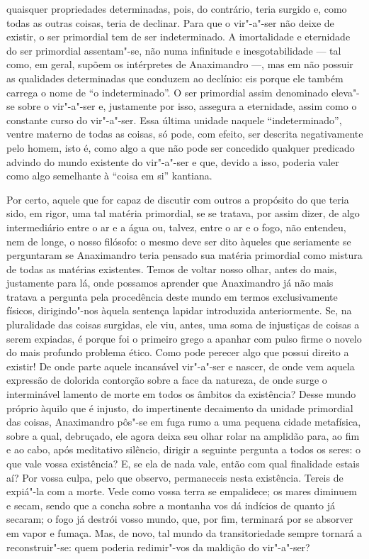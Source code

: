 quaisquer propriedades determinadas, pois, do contrário, teria surgido e,
como todas as outras coisas, teria de declinar. Para que o vir"-a"-ser não
deixe de existir, o ser primordial tem de ser indeterminado. A imortalidade e
eternidade do ser primordial assentam"-se, não numa infinitude e
inesgotabilidade --- tal como, em geral, supõem os intérpretes de
Anaximandro ---, mas em não possuir as qualidades determinadas que conduzem ao
declínio: eis porque ele também carrega o nome de ``o indeterminado''. O ser
primordial assim denominado eleva"-se sobre o vir"-a"-ser e, justamente por
isso, assegura a eternidade, assim como o constante curso do vir"-a"-ser.
Essa última \label{essaultimaunidade} unidade naquele ``indeterminado'',
ventre materno de todas as coisas, só pode, com efeito, ser descrita
negativamente pelo homem, isto é, como algo a que não pode ser concedido
qualquer predicado advindo do mundo existente do vir"-a"-ser e que, devido a
isso, poderia valer como algo semelhante à ``coisa em si'' kantiana.

Por certo, aquele que for capaz de discutir com outros a propósito do que
teria sido, em rigor, uma tal matéria primordial, se se tratava, por assim
dizer, de algo intermediário entre o ar e a água ou, talvez, entre o ar e o
fogo, não entendeu, nem de longe, o nosso filósofo:  o mesmo deve ser dito
àqueles que seriamente se perguntaram se Anaximandro teria pensado sua
matéria primordial como mistura de todas as matérias existentes. Temos de
voltar nosso olhar, antes do mais, justamente para lá, onde possamos aprender
que Anaximandro já não mais tratava a pergunta pela procedência deste mundo
em termos exclusivamente físicos, dirigindo"-nos àquela sentença lapidar
introduzida anteriormente. Se, na pluralidade das coisas surgidas, ele viu,
antes, uma soma de injustiças de coisas a serem expiadas, é porque foi o
primeiro grego a apanhar com pulso firme o novelo do mais profundo problema
ético. Como pode perecer algo que possui direito a existir! De onde parte
aquele incansável vir"-a"-ser e nascer, de onde vem aquela expressão de
dolorida contorção sobre a face da natureza, de onde surge o interminável
lamento de morte em todos os âmbitos da existência? Desse mundo próprio
àquilo que é injusto, do impertinente decaimento da unidade primordial das
coisas, Anaximandro pôs"-se em fuga rumo a uma pequena cidade metafísica,
sobre a qual, debruçado, ele agora deixa seu olhar rolar na amplidão para, ao
fim e ao cabo, após meditativo silêncio, dirigir a seguinte pergunta a todos
os seres: o que vale vossa existência? E, se ela de nada vale, então com
qual \label{oquevale} finalidade estais aí? Por vossa culpa, pelo que
observo, permaneceis nesta existência. Tereis de expiá"-la com a morte. Vede
como vossa terra se empalidece; os mares diminuem e secam, sendo que a concha
sobre a montanha vos dá indícios de quanto já secaram; o fogo já destrói
vosso mundo, que, por fim, terminará por se absorver em vapor e fumaça. Mas,
de novo, tal mundo da transitoriedade sempre tornará a reconstruir"-se: quem
poderia redimir"-vos da maldição do vir"-a"-ser?

